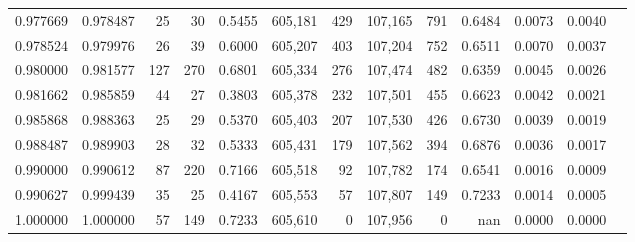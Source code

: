 \begin{tabular}{rrrrrrrrrrrrr}
0.977669 & 0.978487 &    25 &  30 &                                     0.5455 & 605,181 &     429 & 107,165 &     791 & 0.6484 & 0.0073 & 0.0040 \\
0.978524 & 0.979976 &    26 &  39 &                                     0.6000 & 605,207 &     403 & 107,204 &     752 & 0.6511 & 0.0070 & 0.0037 \\
0.980000 & 0.981577 &   127 & 270 &                                     0.6801 & 605,334 &     276 & 107,474 &     482 & 0.6359 & 0.0045 & 0.0026 \\
0.981662 & 0.985859 &    44 &  27 &                                     0.3803 & 605,378 &     232 & 107,501 &     455 & 0.6623 & 0.0042 & 0.0021 \\
0.985868 & 0.988363 &    25 &  29 &                                     0.5370 & 605,403 &     207 & 107,530 &     426 & 0.6730 & 0.0039 & 0.0019 \\
0.988487 & 0.989903 &    28 &  32 &                                     0.5333 & 605,431 &     179 & 107,562 &     394 & 0.6876 & 0.0036 & 0.0017 \\
0.990000 & 0.990612 &    87 & 220 &                                     0.7166 & 605,518 &      92 & 107,782 &     174 & 0.6541 & 0.0016 & 0.0009 \\
0.990627 & 0.999439 &    35 &  25 &                                     0.4167 & 605,553 &      57 & 107,807 &     149 & 0.7233 & 0.0014 & 0.0005 \\
1.000000 & 1.000000 &    57 & 149 &                                     0.7233 & 605,610 &       0 & 107,956 &       0 &    nan & 0.0000 & 0.0000 \\
\bottomrule
\end{tabular}
